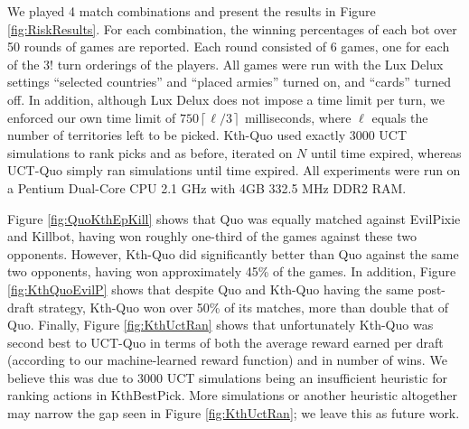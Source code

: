 \documentclass[letterpaper]{article}
\numberwithin{equation}{section}
\numberwithin{theorem}{section}
\numberwithin{lemma}{section}
\numberwithin{df}{section}
\begin{document}
We played 4 match combinations and present the results in Figure \ref{fig:RiskResults}.  For each combination, the winning percentages of each bot over 50 rounds of games are reported.  Each round consisted of 6 games, one for each of the $3!$ turn orderings of the players.  All games were run with the Lux Delux settings ``selected countries'' and ``placed armies'' turned on, and ``cards'' turned off.  In addition, although Lux Delux does not impose a time limit per turn, we enforced our own time limit of $750 \left \lceil \ell / 3 \right \rceil$ milliseconds, where $\ell$ equals the number of territories left to be picked.  Kth-Quo used exactly 3000 UCT simulations to rank picks and as before, iterated on $N$ until time expired, whereas UCT-Quo simply ran simulations until time expired.  All experiments were run on a Pentium Dual-Core CPU 2.1 GHz with 4GB 332.5 MHz DDR2 RAM.  

Figure \ref{fig:QuoKthEpKill} shows that Quo was equally matched against EvilPixie and Killbot, having won roughly one-third of the games against these two opponents.  However, Kth-Quo did significantly better than Quo against the same two opponents, having won approximately 45\% of the games.  In addition, Figure \ref{fig:KthQuoEvilP} shows that despite Quo and Kth-Quo having the same post-draft strategy, Kth-Quo won over 50\% of its matches, more than double that of Quo.  Finally, Figure \ref{fig:KthUctRan} shows that unfortunately Kth-Quo was second best to UCT-Quo in terms of both the average reward earned per draft (according to our machine-learned reward function) and in number of wins.  We believe this was due to 3000 UCT simulations being an insufficient heuristic for ranking actions in KthBestPick.  %
More simulations or another heuristic altogether may narrow the gap seen in Figure \ref{fig:KthUctRan}; we leave this as future work.

\end{document}
